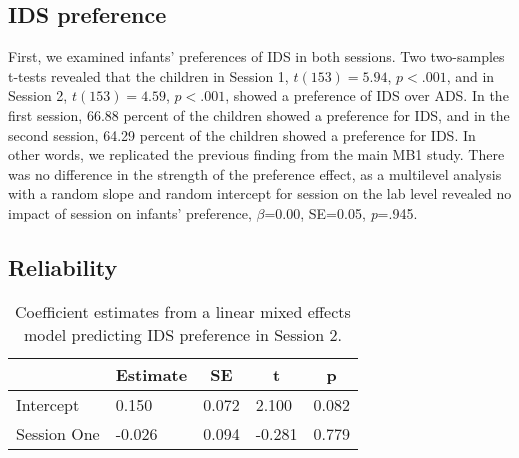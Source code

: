 \documentclass[
  english,
  man,floatsintext]{apa6}
\begin{document}
\hypertarget{ids-preference}{%
\subsection{IDS preference}\label{ids-preference}}

First, we examined infants' preferences of IDS in both sessions. Two two-samples t-tests revealed that the children in Session 1, \(t(153) = 5.94\), \(p < .001\), and in Session 2, \(t(153) = 4.59\), \(p < .001\), showed a preference of IDS over ADS. In the first session, 66.88 percent of the children showed a preference for IDS, and in the second session, 64.29 percent of the children showed a preference for IDS. In other words, we replicated the previous finding from the main MB1 study. There was no difference in the strength of the preference effect, as a multilevel analysis with a random slope and random intercept for session on the lab level revealed no impact of session on infants' preference, \(\beta\)=0.00, SE=0.05, \emph{p}=.945.

\hypertarget{reliability}{%
\subsection{Reliability}\label{reliability}}

\begin{table}[tbp]

\begin{center}
\begin{threeparttable}

\caption{\label{tab:coef_table2}Coefficient estimates from a linear mixed effects model predicting IDS preference in Session 2.}

\begin{tabular}{lllll}
\toprule
 & \multicolumn{1}{c}{Estimate} & \multicolumn{1}{c}{SE} & \multicolumn{1}{c}{t} & \multicolumn{1}{c}{p}\\
\midrule
Intercept & 0.150 & 0.072 & 2.100 & 0.082\\
Session One & -0.026 & 0.094 & -0.281 & 0.779\\
\bottomrule
\end{tabular}

\end{threeparttable}
\end{center}

\end{table}
\end{document}
